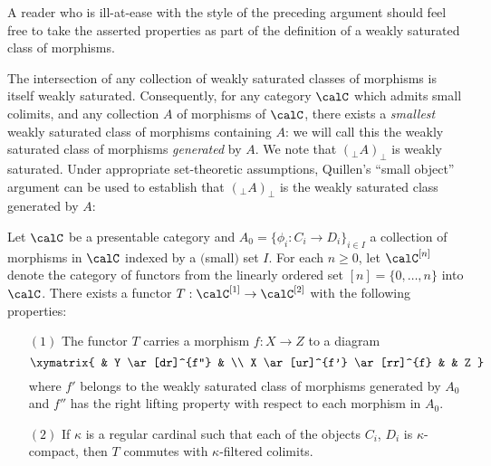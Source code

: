 \begin{CategoryTheory}
\begin{remark}
A reader who is ill-at-ease with the style of the preceding argument should feel free to take
the asserted properties as part of the definition of a weakly saturated class of morphisms.
\end{remark}

The intersection of any collection of weakly saturated classes of morphisms is itself weakly saturated. Consequently, for any category $\calC$ which admits small colimits, and any collection
$A$ of morphisms of $\calC$, there exists a {\em smallest} weakly saturated class of morphisms containing $A$: we will call this the weakly saturated class of morphisms {\it generated} by $A$.
We note that $(_{\perp} A)_{\perp}$ is weakly saturated. Under appropriate set-theoretic assumptions, Quillen's ``small object'' argument can be used to establish that $(_{\perp} A)_{\perp}$ is the weakly saturated class generated by $A$:

\begin{proposition}\label{quillobj}
Let $\calC$ be a presentable category and $A_0 = \{ \phi_i: C_i \rightarrow D_i \}_{i \in I}$ a collection
of morphisms in $\calC$ indexed by a $($small$)$ set $I$. For each $n \geq 0$, let
$\calC^{[n]}$ denote the category of functors from the linearly ordered set $[n] = \{0, \ldots, n\}$ into $\calC$. There exists a functor
$T: \calC^{[1]} \rightarrow \calC^{[2]}$ with the following properties:
\begin{itemize}
\item[$(1)$] The functor $T$ carries a morphism $f: X \rightarrow Z$ to a diagram
$$ \xymatrix{ & Y \ar[dr]^{f''} & \\
X \ar[ur]^{f'} \ar[rr]^{f} & & Z }$$
where $f'$ belongs to the weakly saturated class of morphisms generated by $A_0$ and $f''$
has the right lifting property with respect to each morphism in $A_0$.
\item[$(2)$] If $\kappa$ is a regular cardinal such that each of the objects $C_i$, $D_i$ is $\kappa$-compact, then $T$ commutes with $\kappa$-filtered colimits.
\end{itemize}
\end{proposition}


\end{CategoryTheory}
